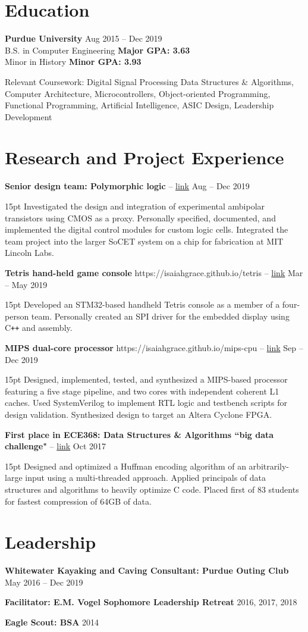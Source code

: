 \documentclass[10pt,letterpaper]{article}
\newcommand{\resumeItem}[4]{
	\begingroup
	\def\link{#2}
	\textbf{#1}
	\ifx\link\empty \else 
		-- \href{#2}{link}
	\fi
	\hfill #3\\
	\begin{adjustwidth}{15pt}{}
	#4
	\end{adjustwidth}
	\endgroup
}
\newcommand{\shortResumeItem}[2]{
	\begingroup
	\textbf{#1}
	\hfill #2\\
	\endgroup
}
\begin{document}
\section*{Education}
\textbf{Purdue University} \hfill Aug 2015 -- Dec 2019 \\
B.S. in Computer Engineering \textbf{Major GPA: 3.63} \\
Minor in History \textbf{Minor GPA: 3.93}

\vspace{2pt}
Relevant Coursework:
Digital Signal Processing
Data Structures \& Algorithms,
Computer Architecture,
Microcontrollers,
Object-oriented Programming,
Functional Programming,
Artificial Intelligence,
ASIC Design,
Leadership Development

\section*{Research and Project Experience}

\resumeItem
{Senior design team: Polymorphic logic}
{}
{Aug -- Dec 2019}
{Investigated the design and integration of experimental ambipolar transistors using CMOS as a proxy. Personally specified, documented, and implemented the digital control modules for custom logic cells. Integrated the team project into the larger SoCET system on a chip for fabrication at MIT Lincoln Labs.}

\resumeItem
{Tetris hand-held game console}
{https://isaiahgrace.github.io/tetris}
{Mar -- May 2019}
{Developed an STM32-based handheld Tetris console as a member of a four-person team. Personally created an SPI driver for the embedded display using C\texttt{++} and assembly.}

\resumeItem
{MIPS dual-core processor}
{https://isaiahgrace.github.io/mips-cpu}
{Sep -- Dec 2019}
{Designed, implemented, tested, and synthesized a MIPS-based processor featuring a five stage pipeline, and two cores with independent coherent L1 caches. Used SystemVerilog to implement RTL logic and testbench scripts for design validation. Synthesized design to target an Altera Cyclone FPGA.}

\resumeItem
{First place in ECE368: Data Structures \& Algorithms ``big data challenge"}
{}
{Oct 2017}
{Designed and optimized a Huffman encoding algorithm of an arbitrarily-large input using a multi-threaded approach. Applied principals of data structures and algorithms to heavily optimize C code. Placed first of 83 students for fastest compression of 64GB of data.}

\section*{Leadership}
\shortResumeItem
{Whitewater Kayaking and Caving Consultant: Purdue Outing Club}
{May 2016 -- Dec 2019}

\shortResumeItem
{Facilitator: E.M. Vogel Sophomore Leadership Retreat}
{2016, 2017, 2018}

\shortResumeItem
{Eagle Scout: BSA}
{2014}
\end{document}
